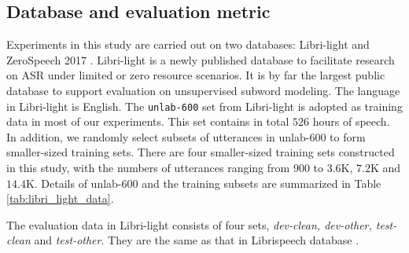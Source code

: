 \documentclass[a4paper]{article}
\begin{document}
\subsection{Database and evaluation metric}
Experiments in this study are carried out on two databases: Libri-light \cite{kahn2019librilight} and ZeroSpeech 2017 \cite{dunbar2017zero}. Libri-light is a newly published   database to facilitate research on ASR under limited or zero resource scenarios. It is by far the largest public database to support evaluation on unsupervised subword modeling. The language in Libri-light is English. The \texttt{unlab-600} set from Libri-light is adopted as training data in most of our experiments. This set contains 
in total $526$ hours of speech. In addition, we randomly select subsets of utterances in unlab-600   to form smaller-sized training sets. There are four smaller-sized training sets constructed in this study, with the numbers of utterances ranging from $900$ to $3.6$K, $7.2$K and $14.4$K. Details of  unlab-600  and the training subsets are summarized in Table \ref{tab:libri_light_data}.
\begin{table}[htbp]
\renewcommand\arraystretch{0.90}
\centering
\caption{Libri-light training data and its subsets.}
\label{tab:libri_light_data}
\end{table}
The evaluation data in Libri-light consists of four sets, \textit{dev-clean, dev-other, test-clean} and \textit{test-other}. 
They are the same as that in Librispeech database \cite{panayotov2015librispeech}.
\end{document}
